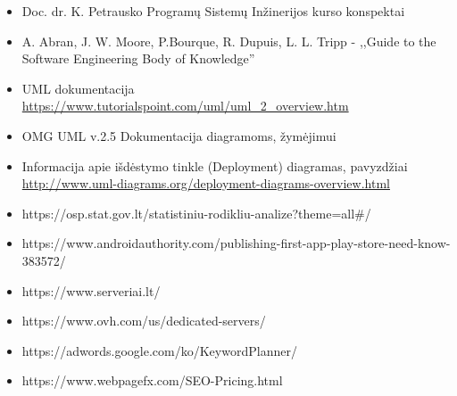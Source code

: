 \documentclass{VUMIFPSkursinis}
\begin{document}
\begin{itemize}
	\item Doc. dr. K. Petrausko Programų Sistemų Inžinerijos kurso konspektai
    \item A. Abran, J. W. Moore, P.Bourque, R. Dupuis, L. L. Tripp - ,,Guide to the Software Engineering Body of Knowledge''
	\item UML dokumentacija \url{https://www.tutorialspoint.com/uml/uml_2_overview.htm}
	\item OMG UML v.2.5 Dokumentacija diagramoms, žymėjimui
	\item Informacija apie išdėstymo tinkle (Deployment) diagramas, pavyzdžiai \url{http://www.uml-diagrams.org/deployment-diagrams-overview.html} 
	\item https://osp.stat.gov.lt/statistiniu-rodikliu-analize?theme=all\#/
	\item https://www.androidauthority.com/publishing-first-app-play-store-need-know-383572/
	\item https://www.serveriai.lt/
	\item https://www.ovh.com/us/dedicated-servers/
	\item https://adwords.google.com/ko/KeywordPlanner/
	\item https://www.webpagefx.com/SEO-Pricing.html
\end{itemize}

		
\end{document}
